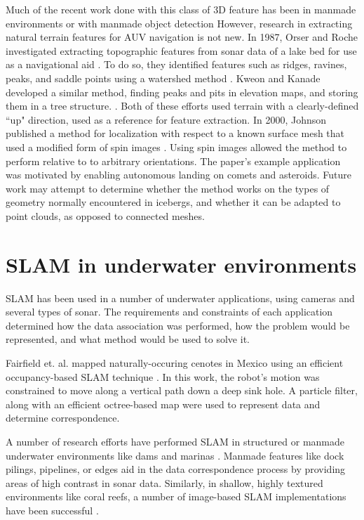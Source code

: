 Much of the recent work done with this class of 3D feature has been in manmade environments or with manmade object detection \cite{Rusu2008,Rusu2011,Koppula2011} However, research in extracting natural terrain features for AUV navigation is not new. In 1987, Orser and Roche investigated extracting topographic features from sonar data of a lake bed for use as a navigational aid \cite{Orser1987}. To do so, they identified features such as ridges, ravines, peaks, and saddle points using a watershed method \cite{Sonka2014}. Kweon and Kanade developed a similar method, finding peaks and pits in elevation maps, and storing them in a tree structure. \cite{Kweon1994}. Both of these efforts used terrain with a clearly-defined ``up" direction, used as a reference for feature extraction. In 2000, Johnson published a method for localization with respect to a known surface mesh that used a modified form of spin images \cite{Johnson1999,Johnson2000}. Using spin images allowed the method to perform relative to to arbitrary orientations. The paper's example application was motivated by enabling autonomous landing on comets and asteroids. Future work may attempt to determine whether the method works on the types of geometry normally encountered in icebergs, and whether it can be adapted to point clouds, as opposed to connected meshes. 



\section{SLAM in underwater environments}


SLAM has been used in a number of underwater applications, using cameras and several types of sonar. The requirements and constraints of each application determined how the data association was performed, how the problem would be represented, and what method would be used to solve it.

Fairfield et. al. mapped naturally-occuring cenotes in Mexico using an efficient occupancy-based SLAM technique \cite{Fairfield2007}. In this work, the robot's motion was constrained to move along a vertical path down a deep sink hole. A particle filter, along with an efficient octree-based map were used to represent data and determine correspondence.

A number of research efforts have performed SLAM in structured or manmade underwater environments like dams and marinas \cite{Ribas2008}. Manmade features like dock pilings, pipelines, or edges aid in the data correspondence process by providing areas of high contrast in sonar data. Similarly, in shallow, highly textured environments like coral reefs, a number of image-based SLAM implementations have been successful \cite{Eustice2005}.

